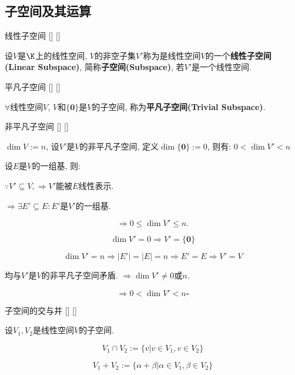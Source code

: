 \documentclass[UTF8]{ctexart}
\begin{document}
	\subsection{子空间及其运算}
		
		\begin{dfn}
			[]
			{线性子空间}
			[]
			[]

			设$V$是$\K$上的线性空间, $V$的非空子集$V'$称为是线性空间$V$的一个\textbf{线性子空间(Linear Subspace)}, 简称\textbf{子空间(Subspace)}, 若$V'$是一个线性空间. 
		\end{dfn}
		
		\begin{ppt}
			[]
			{平凡子空间}
			[]
			[]

			$\forall$线性空间$V$, $V$和$\{\mathbf{0}\}$是$V$的子空间, 称为\textbf{平凡子空间(Trivial Subspace)}. 
		\end{ppt}
		
		\begin{ppt}
			[]
			{非平凡子空间}
			[]
			[]

			$\dim V:=n$, 设$V'$是$V$的非平凡子空间, 定义$\dim \{\mathbf{0}\}:=0$, 则有: $0<\dim V'<n$
		\end{ppt}
  
		\begin{prf}
		
			设$E$是$V$的一组基, 则: 
			
			$\because V'\subseteq V, \Longrightarrow V'$能被$E$线性表示. 
			
			$\Longrightarrow \exists E'\subseteq E: E'$是$V'$的一组基. 
			
			$$\Longrightarrow 0\leq \dim V' \leq n.$$
			
			$$\dim V'=0\Longrightarrow V'=\{\mathbf{0}\}$$
			
			$$\dim V'=n\Longrightarrow |E'|=|E|=n\Longrightarrow E'=E\Longrightarrow V'=V$$
			
			均与$V'$是$V$的非平凡子空间矛盾. $\Longrightarrow \dim V'\neq 0$或$n$. 
			
			$$\Longrightarrow 0<\dim V'<n\square$$
		\end{prf}
  
		\begin{dfn}
			[]
			{子空间的交与并}
			[]
			[]

			设$V_{1},V_{2}$是线性空间$V$的子空间. 
			
			$$V_{1}\cap V_{2}:=\{v|v\in V_{1},v\in V_{2}\}$$
			
			$$V_{1}+V_{2}:=\{\alpha+\beta|\alpha\in V_{1}, \beta\in V_{2}\}$$
		\end{dfn}
		
\end{document}
